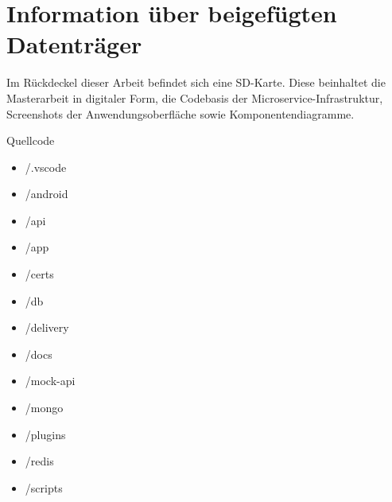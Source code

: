 \chapter{Information über beigefügten Datenträger}
\label{chap:informationueberbeigefuegtendatentraeger}
Im Rückdeckel dieser Arbeit befindet sich eine SD-Karte. Diese beinhaltet
die Masterarbeit in digitaler Form, die Codebasis der Microservice-Infrastruktur,
Screenshots der Anwendungsoberfläche sowie Komponentendiagramme.

Quellcode

\begin{itemize}
  \item /.vscode
  \item /android
  \item /api
  \item /app
  \item /certs
  \item /db
  \item /delivery
  \item /docs
  \item /mock-api
  \item /mongo
  \item /plugins
  \item /redis
  \item /scripts
\end{itemize}
